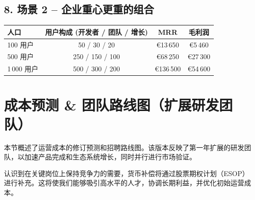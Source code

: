 \documentclass[11pt, a4paper, oneside]{article}
\begin{document}
\subsection*{8. 场景 2 – 企业重心更重的组合}
\begin{center}
\begin{tabular}{@{}lccc@{}}
\toprule
\textbf{人口} & \textbf{用户构成} (开发者 / 团队 / 增长) & \textbf{MRR} & \textbf{毛利润} \\
\midrule
100 用户   & 50 / 30 / 20   & €13\,650  & €5\,460  \\
500 用户   & 250 / 150 / 100 & €68\,250  & €27\,300 \\
1\,000 用户 & 500 / 300 / 200 & €136\,500 & €54\,600 \\
\bottomrule
\end{tabular}
\end{center}



\section*{成本预测 \& 团队路线图（扩展研发团队）}
本节概述了运营成本的修订预测和招聘路线图。该版本反映了第一年扩展的研发团队，以加速产品完成和生态系统增长，同时并行进行市场验证。

认识到在关键岗位上保持竞争力的需要，货币补偿将通过股票期权计划（ESOP）进行补充。这将使我们能够吸引高水平的人才，协调长期利益，并优化初始运营成本。
\end{document}
